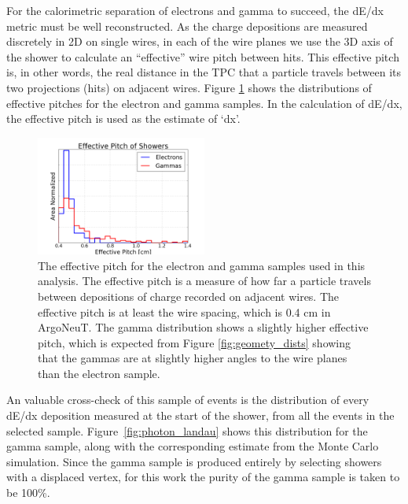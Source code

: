 For the calorimetric separation of electrons and gamma to succeed, the dE/dx metric must be well reconstructed. As the charge depositions are measured discretely in 2D on single wires, in each of the wire planes we use the 3D axis of the shower to calculate an ``effective'' wire pitch between hits.  This effective pitch is, in other words, the real distance in the TPC that a particle travels between its two projections (hits) on adjacent wires. Figure \ref{fig:effective_pitch} shows the distributions of effective pitches for the electron and gamma samples.  In the calculation of dE/dx, the effective pitch is used as the estimate of `dx'.

\begin{figure}[p]
  \centering
  \includegraphics[width=0.5\textwidth]{emshower_figures/effective_pitch.png}
  \caption{The effective pitch for the electron and gamma samples used in this analysis.  The effective pitch is a measure of how far a particle travels between depositions of charge recorded on adjacent wires.  The effective pitch is at least the wire spacing, which is 0.4 cm in ArgoNeuT.  The gamma distribution shows a slightly higher effective pitch, which is expected from Figure \ref{fig:geomety_dists} showing that the gammas are at slightly higher angles to the wire planes than the electron sample.}
  \label{fig:effective_pitch}
\end{figure}

An valuable cross-check of this sample of events is the distribution of every dE/dx deposition measured at the start of the shower, from all the events in the selected sample.  Figure~\ref{fig:photon_landau} shows this distribution for the gamma sample, along with the corresponding estimate from the Monte Carlo simulation.  Since the gamma sample is produced entirely by selecting showers with a displaced vertex, for this work the purity of the gamma sample is taken to be 100\%.

